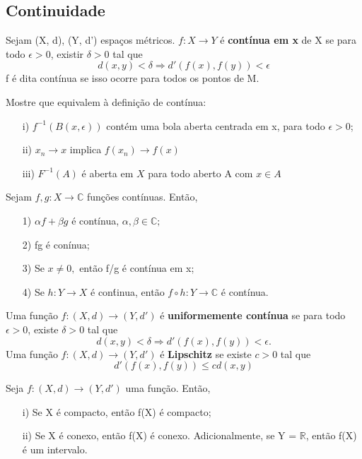 \documentclass[complex.tex]{subfiles}
\begin{document}
\subsection{Continuidade}
\begin{def*}
	Sejam (X, d), (Y, d') espaços métricos. $f:X\rightarrow Y$ é \textbf{contínua em x} de X se para todo $\epsilon > 0$, existir
	$\delta > 0$ tal que
	$$
		d(x, y) < \delta\Rightarrow d'(f(x), f(y)) < \epsilon
	$$
	f é dita contínua se isso ocorre para todos os pontos de M.
\end{def*}
\begin{exer*}
	Mostre que equivalem à definição de contínua:
	\begin{itemize}
		\item[i)] $f^{-1}(B(x, \epsilon))$ contém uma bola aberta centrada em x, para todo $\epsilon > 0$;
		\item[ii)] $x_{n}\to{x}$ implica $f(x_{n})\to{f(x)}$
		\item[iii)] $F ^{-1}(A)$ é aberta em $X$ para todo aberto A com $x\in{A}$
	\end{itemize}
\end{exer*}
\begin{prop*}
	Sejam $f, g:X\rightarrow \mathbb{C}$ funções contínuas. Então,
	\begin{itemize}
		\item[1)] $\alpha f + \beta g$ é contínua, $\alpha, \beta\in \mathbb{C};$
		\item[2)] fg é conínua;
		\item[3)] Se $x\neq{0},$ então f/g é contínua em x;
		\item[4)] Se $h:Y\rightarrow X$ é con\'tinua, então $f\circ{h}:Y\rightarrow \mathbb{C}$ é contínua.
	\end{itemize}
\end{prop*}
\begin{def*}
	Uma função $f:(X, d)\rightarrow (Y, d')$ é \textbf{uniformemente contínua} se para todo $\epsilon > 0$, existe $\delta > 0$
	tal que
	$$
		d(x, y) < \delta\Rightarrow d'(f(x), f(y)) < \epsilon.
	$$
	Uma função $f:(X, d)\rightarrow (Y, d')$ é \textbf{Lipschitz} se existe $c > 0$ tal que
	$$
		d'(f(x), f(y)) \leq cd(x, y)
	$$
\end{def*}
\begin{theorem*}
	Seja $f:(X, d)\rightarrow (Y, d')$ uma função. Então,
	\begin{itemize}
		\item[i)] Se X é compacto, então f(X) é compacto;
		\item[ii)] Se X é conexo, então f(X) é conexo. Adicionalmente, se Y = $\mathbb{R}$, então f(X) é um intervalo.
	\end{itemize}
\end{theorem*}
\end{document}
